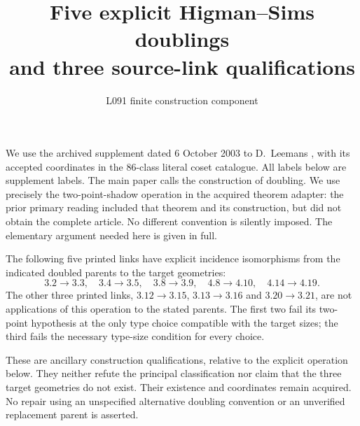 \documentclass[11pt]{article}
\title{Five explicit Higman--Sims doublings\\and three source-link qualifications}
\author{L091 finite construction component}\date{}
\begin{document}
\maketitle
We use the archived supplement dated 6 October 2003 to D.~Leemans
\cite{HS}, with its accepted coordinates in the 86-class literal coset
catalogue. All labels below are supplement labels. The main paper calls
the construction of \cite[Theorem 4.1]{LPP} doubling. We use precisely the
two-point-shadow operation in the acquired theorem adapter: the prior
primary reading included that theorem and its construction, but did not
obtain the complete article. No different convention is silently imposed.
The elementary argument needed here is given in full.

\begin{theorem}
The following five printed links have explicit incidence isomorphisms
from the indicated doubled parents to the target geometries:
\[
3.2\longrightarrow3.3,\quad3.4\longrightarrow3.5,\quad
3.8\longrightarrow3.9,\quad4.8\longrightarrow4.10,\quad
4.14\longrightarrow4.19.
\]
The other three printed links, $3.12\to3.15$, $3.13\to3.16$ and
$3.20\to3.21$, are not applications of this operation to the stated
parents. The first two fail its two-point hypothesis at the only type
choice compatible with the target sizes; the third fails the necessary
type-size condition for every choice.
\end{theorem}
These are ancillary construction qualifications, relative to the explicit
operation below. They neither refute the principal classification nor
claim that the three target geometries do not exist. Their existence and
coordinates remain acquired. No repair using an unspecified alternative
doubling convention or an unverified replacement parent is asserted.
\end{document}
